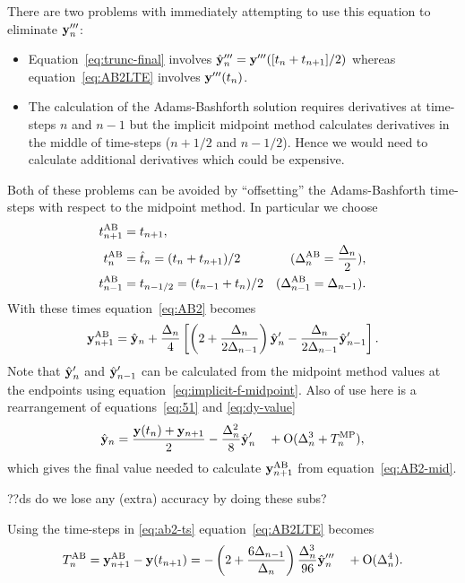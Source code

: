 There are two problems with immediately attempting to use this equation to eliminate $\mathbf{y}'''_n$:
\begin{itemize}
\item Equation~\eqref{eq:trunc-final} involves $\hat{\mathbf{y}}_{n}''' = \mathbf{y}'''([t_n +t_{n+1}]/2)$ whereas equation~\eqref{eq:AB2LTE} involves $\mathbf{y}'''(t_n)$.
\item The calculation of the Adams-Bashforth solution requires derivatives at time-steps $n$ and $n-1$ but the implicit midpoint method calculates derivatives in the middle of time-steps (\ie $n+ 1/2$ and $n - 1/2$).
  Hence we would need to calculate additional derivatives which could be expensive.
\end{itemize}

Both of these problems can be avoided by ``offsetting'' the Adams-Bashforth time-steps with respect to the midpoint method.
In particular we choose
\begin{align}
  t_{n+1}^{\text{AB}} &= t_{n+1}, \notag\\
  t_n^{\text{AB}} &= \hat{t}_{n} = (t_{n} + t_{n+1})/2 &(\Delta_{n}^{\text{AB}} = \frac{\Delta_{n}}{2}), \notag \\
  t_{n-1}^{\text{AB}} &= t_{n - 1/2} = (t_{n-1} + t_n)/2  &(\Delta_{n-1}^{\text{AB}} = \Delta_{n-1}).
  \label{eq:ab2-ts}
\end{align}
With these times equation~\eqref{eq:AB2} becomes
\begin{equation}
   \mathbf{y}_{n+1}^{\text{AB}} = \hat{\mathbf{y}}_{n} + \frac{\Delta_{n}}{4} \left[
     \left (2 + \frac{\Delta_{n}}{2\Delta_{n-1}} \right) \hat{\mathbf{y}}_{n}'
     - \frac{\Delta_{n}}{2\Delta_{n-1}} \hat{\mathbf{y}}_{n-1}'
     \right].
   \label{eq:AB2-mid}
\end{equation}
Note that $\hat{\mathbf{y}}_{n}'$ and $\hat{\mathbf{y}}_{n-1}'$ can be calculated from the midpoint method values at the endpoints using equation~\eqref{eq:implicit-f-midpoint}. Also of use here is a rearrangement of equations~\eqref{eq:51} and \eqref{eq:dy-value}
\begin{equation}
  \hat{\mathbf{y}}_{n} = \frac{\mathbf{y}(t_n) + \mathbf{y}_{n+1}}{2} -\frac{\Delta_{n}^2}{8} \hat{\mathbf{y}}_{n}' \quad + \text{O}(\Delta_{n}^3 + T_n^{\text{MP}}),
\end{equation}
which gives the final value needed to calculate $\mathbf{y}_{n+1}^{\text{AB}}$ from equation~\eqref{eq:AB2-mid}.

??ds do we lose any (extra) accuracy by doing these subs?

Using the time-steps in \eqref{eq:ab2-ts} equation~\eqref{eq:AB2LTE} becomes
\begin{equation}
  T_n^{\text{AB}} = \mathbf{y}_{n+1}^{\text{AB}} - \mathbf{y}(t_{n+1})
  = - \left( 2 + \frac{6 \Delta_{n-1}}{\Delta_{n}} \right) \frac{\Delta_{n}^3}{96} \hat{\mathbf{y}}_{n}'''
  \quad + \text{O}(\Delta_{n}^4).
\label{eq:AB2-mid-LTE}
\end{equation}

